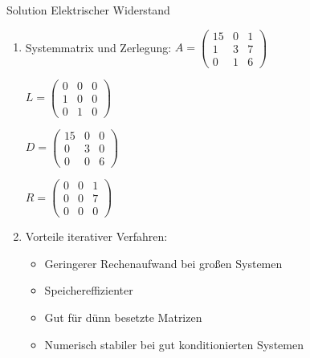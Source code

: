 \begin{KR}{Solution Elektrischer Widerstand}
\begin{enumerate}
    \item Systemmatrix und Zerlegung:
    $A = \begin{pmatrix}
    15 & 0 & 1\\
    1 & 3 & 7\\
    0 & 1 & 6
    \end{pmatrix}$
    
    $L = \begin{pmatrix}
    0 & 0 & 0\\
    1 & 0 & 0\\
    0 & 1 & 0
    \end{pmatrix}$
    
    $D = \begin{pmatrix}
    15 & 0 & 0\\
    0 & 3 & 0\\
    0 & 0 & 6
    \end{pmatrix}$
    
    $R = \begin{pmatrix}
    0 & 0 & 1\\
    0 & 0 & 7\\
    0 & 0 & 0
    \end{pmatrix}$
    
    \item Vorteile iterativer Verfahren:
    \begin{itemize}
        \item Geringerer Rechenaufwand bei großen Systemen
        \item Speichereffizienter
        \item Gut für dünn besetzte Matrizen
        \item Numerisch stabiler bei gut konditionierten Systemen
    \end{itemize}
\end{enumerate}
\end{KR}

